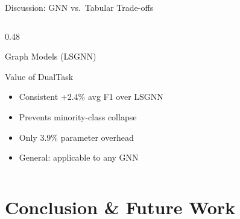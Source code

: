 \documentclass[aspectratio=169, 10pt]{beamer}
\begin{document}
\begin{frame}{Discussion: GNN vs.\ Tabular Trade-offs}
\begin{columns}[T]
\begin{column}{0.48\textwidth}
\begin{block}{Graph Models (LSGNN)}
\begin{itemize}
\end{itemize}
\end{block}
\vspace{0.2cm}
\begin{exampleblock}{Value of DualTask}
\begin{itemize}
    \item Consistent +2.4\% avg F1 over LSGNN
    \item Prevents minority-class collapse
    \item Only 3.9\% parameter overhead
    \item General: applicable to any GNN
\end{itemize}
\end{exampleblock}
\end{column}
\end{columns}
\end{frame}

\section{Conclusion \& Future Work}
\end{document}
